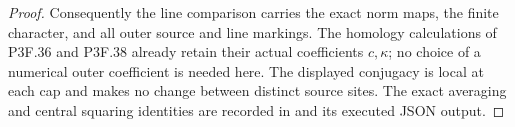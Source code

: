 \begin{proof}
Consequently the line comparison carries the exact norm maps,
the finite character, and all outer source and line markings.
The homology calculations of P3F.36 and P3F.38 already retain
their actual coefficients $c,\kappa$; no choice of a numerical
outer coefficient is needed here. The displayed conjugacy is
local at each cap and makes no change between distinct source
sites. The exact averaging and central squaring identities are
recorded in  and its
executed JSON output.
\end{proof}
